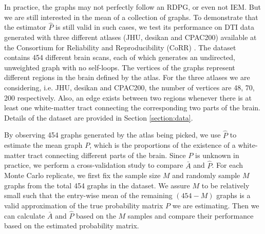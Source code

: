 \documentclass[a4paper]{article}
\begin{document}
In practice, the graphs may not perfectly follow an RDPG, or even not IEM. But we are still interested in the mean of a collection of graphs. To demonstrate that the estimator $\hat{P}$ is still valid in such cases, we test its performance on DTI data generated with three different atlases (JHU, desikan and CPAC200) available at the Consortium for Reliability and Reproducibility (CoRR) \cite{zuo2014open, gorgolewski2015high}. The dataset contains 454 different brain scans, each of which generates an undirected, unweighted graph with no self-loops. The vertices of the graphs represent different regions in the brain defined by the atlas. For the three atlases we are considering, i.e. JHU, desikan and CPAC200, the number of vertices are 48, 70, 200 respectively. Also, an edge exists between two regions whenever there is at least one white-matter tract connecting the corresponding two parts of the brain. Details of the dataset are provided in Section \ref{section:data}.

By observing 454 graphs generated by the atlas being picked, we use $\hat{P}$ to estimate the mean graph $P$, which is the proportions of the existence of a white-matter tract connecting different parts of the brain. Since $P$ is unknown in practice, we perform a cross-validation study to compare $\bar{A}$ and $\hat{P}$. For each Monte Carlo replicate, we first fix the sample size $M$ and randomly sample $M$ graphs from the total 454 graphs in the dataset. We assure $M$ to be relatively small such that the entry-wise mean of the remaining $(454 - M)$ graphs is a valid approximation of the true probability matrix $P$ we are estimating. Then we can calculate $\bar{A}$ and $\hat{P}$ based on the $M$ samples and compare their performance based on the estimated probability matrix.
\end{document}
